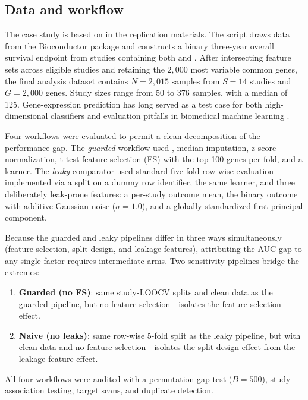 \documentclass[article,shortnames]{jss}
\begin{document}
\subsection{Data and workflow}

The case study is based on  in the replication
materials. The script draws data
from the  Bioconductor package \citep{ganzfried2013} and constructs a
binary three-year overall survival endpoint from studies containing both
 and . After intersecting feature
sets across eligible studies and retaining the $2{,}000$ most variable common
genes, the final analysis dataset contains $N = 2{,}015$ samples from $S = 14$
studies and $G = 2{,}000$ genes. Study sizes range from 50 to 376 samples, with a
median of 125. Gene-expression prediction has long served as a
test case for both high-dimensional classifiers and evaluation pitfalls in
biomedical machine learning \citep{golub1999, simon2003, tarca2007}.

Four workflows were evaluated to permit a clean decomposition of the
performance gap. The \emph{guarded} workflow used , median
imputation, z-score normalization, t-test feature selection (FS) with the top 100
genes per fold, and a  learner. The \emph{leaky} comparator used
standard five-fold row-wise evaluation implemented via a
 split on a dummy row identifier, the same learner,
and three deliberately leak-prone features: a per-study outcome mean, the
binary outcome with additive Gaussian noise ($\sigma = 1.0$), and a globally
standardized first principal component.

Because the guarded and leaky pipelines differ in three ways simultaneously
(feature selection, split design, and leakage features), attributing the
AUC gap to any single factor requires intermediate arms. Two sensitivity
pipelines bridge the extremes:
\begin{enumerate}
\item \textbf{Guarded (no FS)}: same study-LOOCV splits and clean data as the
  guarded pipeline, but no feature selection---isolates the feature-selection
  effect.
\item \textbf{Naive (no leaks)}: same row-wise 5-fold split as the leaky pipeline,
  but with clean data and no feature selection---isolates the split-design
  effect from the leakage-feature effect.
\end{enumerate}

All four workflows were audited with a permutation-gap test
($B = 500$), study-association testing, target scans, and duplicate detection.
\end{document}

